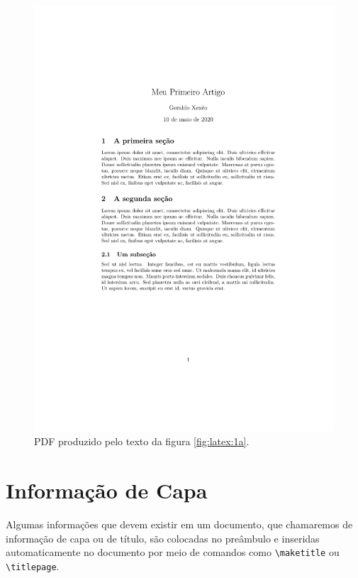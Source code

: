 \begin{figure}
    \centering
    \includegraphics[height=.8\textheight,frame]{primeiroartigo}
    \caption{PDF produzido pelo texto da figura \ref{fig:latex:1a}.}
    \label{fig:primeiroartigo}
\end{figure}


\section{Informação de Capa}

Algumas informações que devem existir em um documento, que chamaremos de informação de capa ou de título, são colocadas no preâmbulo e inseridas automaticamente no documento por meio de comandos como 
\lstinline|\maketitle| ou \lstinline|\titlepage|.

